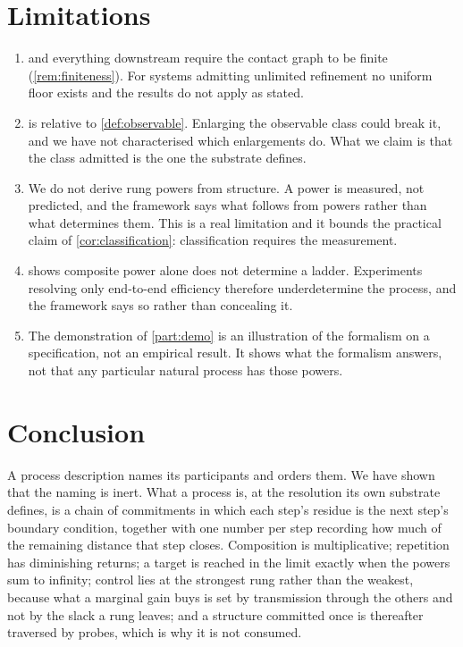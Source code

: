 \documentclass[11pt,twocolumn,a4paper]{article}
\theoremstyle{plain}
\theoremstyle{definition}
\theoremstyle{remark}
\begin{document}
\section{Limitations}
\label{sec:limitations}

\begin{enumerate}[leftmargin=2em,itemsep=0.4em]
\item {} and everything downstream require the contact graph to be
finite (\cref{rem:finiteness}). For systems admitting unlimited refinement no
uniform floor exists and the results do not apply as stated.
\item {} is relative to \cref{def:observable}. Enlarging the
observable class could break it, and we have not characterised which
enlargements do. What we claim is that the class admitted is the one the
substrate defines.
\item We do not derive rung powers from structure. A power is measured, not
predicted, and the framework says what follows from powers rather than what
determines them. This is a real limitation and it bounds the practical claim of
\cref{cor:classification}: classification requires the measurement.
\item {} shows composite power alone does not determine a
ladder. Experiments resolving only end-to-end efficiency therefore
underdetermine the process, and the framework says so rather than concealing it.
\item The demonstration of \cref{part:demo} is an illustration of the formalism
on a specification, not an empirical result. It shows what the formalism answers,
not that any particular natural process has those powers.
\end{enumerate}

\section{Conclusion}
\label{sec:conclusion}

A process description names its participants and orders them. We have shown
that the naming is inert. What a process is, at the resolution its own substrate
defines, is a chain of commitments in which each step's residue is the next
step's boundary condition, together with one number per step recording how much
of the remaining distance that step closes. Composition is multiplicative;
repetition has diminishing returns; a target is reached in the limit exactly
when the powers sum to infinity; control lies at the strongest rung rather
than the weakest, because what a marginal gain buys is set by transmission
through the others and not by the slack a rung leaves; and a structure
committed once is thereafter traversed by probes, which is why it is not
consumed.
\end{document}
